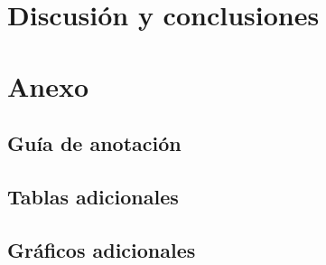 \documentclass[colorinlistoftodos]{article}
\begin{document}
\section{Discusi\'on y conclusiones}\label{section-discussion}


\newpage



\clearpage
\appendix
\section{Anexo}\label{appendix}

\subsection{Gu\'ia de anotaci\'on}\label{appendix-annotation}


\subsection{Tablas adicionales}\label{appendix-tables}


\subsection{Gr\'aficos adicionales}\label{appendix-plots}


\end{document}
